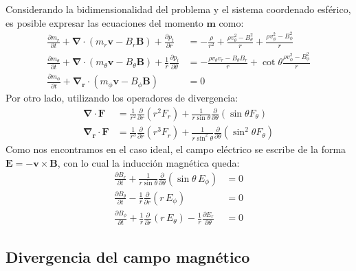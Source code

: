 \documentclass[11pt, letterpaper]{article}
\begin{document}
Considerando la bidimensionalidad del problema y el sistema coordenado esférico, es posible expresar las ecuaciones del momento $\mathbf{m}$ como:\cite{plutomanual}
\begin{subequations}\label{eq:momento_2D_esferico}
    \begin{align}
         \frac{\partial m_r}{\partial t} + \mathbf{\nabla \cdot} (m_r \mathbf{v} - B_r \mathbf{B}) + \frac{\partial p_t}{\partial r} &= -\frac{\rho}{r^2} + \frac{\rho v_\theta ^2 - B_\theta ^2}{r} + \frac{\rho v_\phi ^2 - B_\phi ^2}{r} \\[7pt]
         \frac{\partial m_\theta}{\partial t} + \mathbf{\nabla \cdot} (m_\theta \mathbf{v} - B_\theta \mathbf{B}) + \frac{1}{r}\frac{\partial p_t}{\partial \theta} &= - \frac{\rho v_\theta v_r - B_\theta B_r}{r} + \cot{\theta} \frac{\rho v_\phi ^2 - B_\phi ^2}{r} \\[7pt]
         \frac{\partial m_\phi}{\partial t} + \mathbf{\nabla_r \cdot} (m_\phi \mathbf{v} - B_\phi \mathbf{B}) &= 0
    \end{align}
\end{subequations}
Por otro lado, utilizando los operadores de divergencia:
\begin{align*}
    \mathbf{\nabla \cdot F} &= \frac{1}{r^2} \frac{\partial}{\partial r} (r^2 F_r) + \frac{1}{r \sin \theta} \frac{\partial}{\partial \theta} (\sin \theta F_\theta) \\[5pt]
    \mathbf{\nabla_r \cdot F} &= \frac{1}{r^3} \frac{\partial}{\partial r} (r^3 F_r) + \frac{1}{r \sin^2 \theta} \frac{\partial}{\partial \theta} (\sin^2 \theta F_\theta)
\end{align*}
Como nos encontramos en el caso ideal, el campo eléctrico se escribe de la forma $\mathbf{E = - v \times B}$, con lo cual la inducción magnética queda:
\begin{subequations}
    \begin{align}
        \frac{\partial B_r}{\partial t} + \frac{1}{r \sin\theta} \frac{\partial}{\partial \theta}(\sin\theta \, E_\phi) &= 0\\[5pt]
        \frac{\partial B_\theta}{\partial t} - \frac{1}{r} \frac{\partial}{\partial r}(r \, E_\phi) &= 0\\[5pt]
        \frac{\partial B_\phi}{\partial t} + \frac{1}{r} \frac{\partial}{\partial r}(r \, E_\theta) - \frac{1}{r} \frac{\partial E_r}{\partial \theta} &= 0
    \end{align}
\end{subequations}

\subsection{Divergencia del campo magnético}
\end{document}
